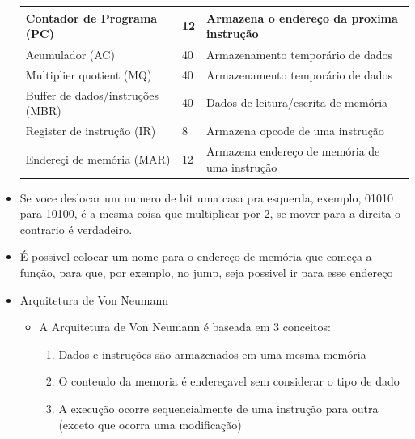\documentclass[12pt]{article}
\begin{document}
\begin{itemize}
\begin{table}[H]
\begin{center}
\begin{tabular}{|p{6cm}|p{1.75cm}|p{6cm}|}
                Contador de Programa (PC) & 12 &  Armazena o endereço da 
                proxima instrução \\ 
                \hline
                Acumulador (AC) & 40 & Armazenamento temporário de dados\\
                \hline
                Multiplier quotient (MQ) & 40 & Armazenamento temporário de 
                dados \\
                \hline
                Buffer de dados/instruções (MBR) & 40 & Dados de 
                leitura/escrita de memória \\
                \hline
                Register de instrução (IR) & 8 & Armazena opcode de uma 
                instrução\\ 
                \hline
                Endereçi de memória (MAR) & 12 & Armazena endereço de 
                memória de uma instrução \\
                \hline
            \end{tabular}
            \end{center}
        \end{table}
        \item Se voce deslocar um numero de bit uma casa pra esquerda, 
        exemplo, 01010 para 10100, é a mesma coisa que multiplicar por 2, 
        se mover para a direita o contrario é verdadeiro.
        \item É possivel colocar um nome para o endereço de memória que começa 
        a função, para que, por exemplo, no jump, seja possivel ir para esse 
        endereço
        \item Arquitetura de Von Neumann
        \begin{itemize}
            \item A Arquitetura de Von Neumann é baseada em 3 conceitos:
            \begin{enumerate}[label=\arabic*)]
                \item Dados e instruções são armazenados em uma mesma memória
                \item O conteudo da memoria é endereçavel sem considerar o 
                tipo de dado
                \item A execução ocorre sequencialmente de uma instrução 
                para outra (exceto que ocorra uma modificação)
            \end{enumerate}
        \end{itemize}
    \end{itemize}
\end{document}
